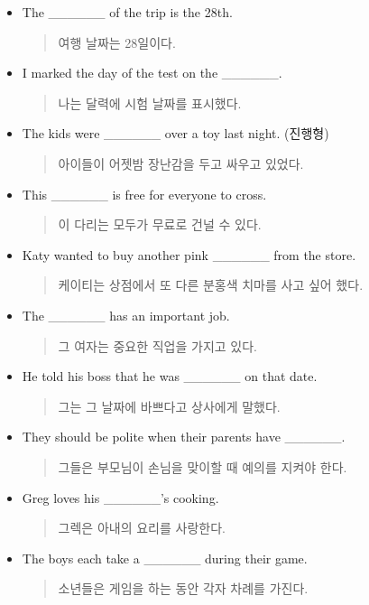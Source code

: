 \documentclass{article}
\begin{document}
\begin{addmargin}[1em]{1em}
\begin{itemize}
\begin{quote}
    \end{quote}
    \item The \_\_\_\_\_\_ of the trip is the 28th.
    \begin{quote}
    여행 날짜는 28일이다.
    \end{quote}
    \item I marked the day of the test on the \_\_\_\_\_\_.
    \begin{quote}
    나는 달력에 시험 날짜를 표시했다.
    \end{quote}
    \item The kids were \_\_\_\_\_\_ over a toy last night. (진행형)
    \begin{quote}
    아이들이 어젯밤 장난감을 두고 싸우고 있었다.
    \end{quote}
    \item This \_\_\_\_\_\_ is free for everyone to cross.
    \begin{quote}
    이 다리는 모두가 무료로 건널 수 있다.
    \end{quote}
    \item Katy wanted to buy another pink \_\_\_\_\_\_ from the store.
    \begin{quote}
    케이티는 상점에서 또 다른 분홍색 치마를 사고 싶어 했다.
    \end{quote}
    \item The \_\_\_\_\_\_ has an important job.
    \begin{quote}
    그 여자는 중요한 직업을 가지고 있다.
    \end{quote}
    \item He told his boss that he was \_\_\_\_\_\_ on that date.
    \begin{quote}
    그는 그 날짜에 바쁘다고 상사에게 말했다.
    \end{quote}
    \item They should be polite when their parents have \_\_\_\_\_\_.
    \begin{quote}
    그들은 부모님이 손님을 맞이할 때 예의를 지켜야 한다.
    \end{quote}
    \item Greg loves his \_\_\_\_\_\_'s cooking.
    \begin{quote}
    그렉은 아내의 요리를 사랑한다.
    \end{quote}
    \item The boys each take a \_\_\_\_\_\_ during their game.
    \begin{quote}
    소년들은 게임을 하는 동안 각자 차례를 가진다.
    \end{quote}

\end{itemize}
\end{addmargin}
\end{document}
